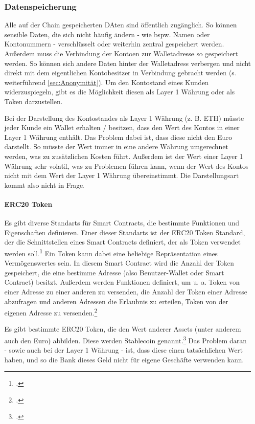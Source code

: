 \subsubsection{Datenspeicherung}
Alle auf der Chain gespeicherten DAten sind öffentlich zugänglich.
So können sensible Daten, die sich nicht häufig ändern - wie bspw. Namen oder Kontonummern - verschlüsselt oder weiterhin zentral gespeichert werden.
Außerdem muss die Verbindung der Kontoen zur Walletadresse so gespeichert werden. 
So können sich andere Daten hinter der Walletadress verbergen und nicht direkt mit dem eigentlichen Kontobesitzer in Verbindung gebracht werden (s. weiterführend \ref{sec:Anonymität}).
Um den Kontostand eines Kunden widerzuspiegeln, gibt es die Möglichkeit diesen als Layer 1 Währung oder als Token darzustellen.

\noindent
Bei der Darstellung des Kontostandes als Layer 1 Währung (z. B. ETH) müsste jeder Kunde ein Wallet erhalten / besitzen, dass den Wert des Kontos in einer Layer 1 Währung enthält.
Das Problem dabei ist, dass diese nicht den Euro darstellt. 
So müsste der Wert immer in eine andere Währung umgerechnet werden, was zu zusätzlichen Kosten führt. Außerdem ist der Wert einer Layer 1 Währung sehr volatil, was zu Problemen führen kann, wenn der Wert des Kontos nicht mit dem Wert der Layer 1 Währung übereinstimmt.
Die Darstellungsart kommt also nicht in Frage.

\paragraph{ERC20 Token}
Es gibt diverse Standarts für Smart Contracts, die bestimmte Funktionen und Eigenschaften definieren.
Einer dieser Standarts ist der ERC20 Token Standard, der die Schnittstellen eines Smart Contracts definiert, der als Token verwendet werden soll.\footcite[Vgl. hierzu und zum Folgenden][]{w7}
Ein Token kann dabei eine beliebige Repräsentation eines Vermögenswertes sein.
In diesem Smart Contract wird die Anzahl der Token gespeichert, die eine bestimme Adresse (also Benutzer-Wallet oder Smart Contract) besitzt.
Außerdem werden Funktionen definiert, um u. a. Token von einer Adresse zu einer anderen zu versenden, die Anzahl der Token einer Adresse abzufragen und anderen Adressen die Erlaubnis zu erteilen, Token von der eigenen Adresse zu versenden.\footcites[Vgl.][]{w8}[]{w7}

\bigbreak
\noindent
Es gibt bestimmte ERC20 Token, die den Wert anderer Assets (unter anderem auch den Euro) abbilden. Diese werden Stablecoin genannt.\footcite[Vgl. hierzu und weiterführend][4]{q8}
Das Problem daran - sowie auch bei der Layer 1 Währung - ist, dass diese einen tatsächlichen Wert haben, und so die Bank dieses Geld nicht für eigene Geschäfte verwenden kann.

